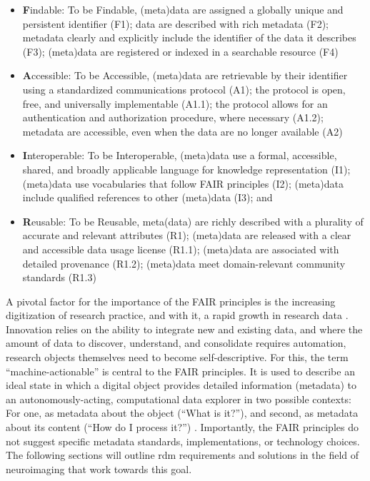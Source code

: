 \begin{itemize}
	\item \textbf{F}indable: To be Findable, (meta)data  are assigned a globally unique and persistent identifier (F1); data are described with rich metadata (F2); metadata clearly and explicitly include the identifier of the data it describes (F3);  (meta)data are registered or indexed in a searchable resource (F4)
	\item \textbf{A}ccessible: To be Accessible, (meta)data are retrievable by their identifier using a standardized communications protocol (A1); the protocol is open, free, and universally implementable (A1.1); the protocol allows for an authentication and authorization procedure, where necessary (A1.2);  metadata are accessible, even when the data are no longer available (A2)
	\item \textbf{I}nteroperable:  To be Interoperable, (meta)data use a formal, accessible, shared, and broadly applicable language for knowledge representation (I1); (meta)data use vocabularies that follow FAIR principles (I2); (meta)data include qualified references to other (meta)data (I3); and
	\item \textbf{R}eusable: To be Reusable, meta(data) are richly described with a plurality of accurate and relevant attributes (R1); (meta)data are released with a clear and accessible data usage license (R1.1); (meta)data are associated with detailed provenance (R1.2); (meta)data meet domain-relevant community standards (R1.3)
\end{itemize}

A pivotal factor for the importance of the FAIR principles is the increasing digitization of research practice, and with it, a rapid growth in research data \citep{dfg}.
Innovation relies on the ability to integrate new and existing data, and where the amount of data to discover, understand, and consolidate requires automation, research objects themselves need to become self-descriptive.
For this, the term ``machine-actionable'' is central to the \gls{FAIR} principles.
It is used to describe an ideal state in which a digital object provides detailed information (metadata) to an autonomously-acting, computational data explorer in two possible contexts: For one, as metadata about the object (``What is it?''), and second, as metadata about its content (``How do I process it?'') \citep{wilkinson2016fair}.
Importantly, the \gls{FAIR} principles do not suggest specific metadata standards, implementations, or technology choices.
The following sections will outline \gls{rdm} requirements and solutions in the field of neuroimaging that work towards this goal.

